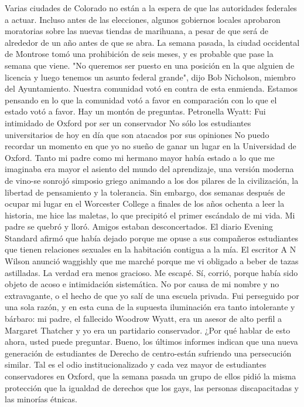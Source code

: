 Varias ciudades de Colorado no están a la espera de que las autoridades federales a actuar.
Incluso antes de las elecciones, algunos gobiernos locales aprobaron moratorias sobre las nuevas tiendas de marihuana, a pesar de que será de alrededor de un año antes de que se abra.
La semana pasada, la ciudad occidental de Montrose tomó una prohibición de seis meses, y es probable que pase la semana que viene.
"No queremos ser puesto en una posición en la que alguien de licencia y luego tenemos un asunto federal grande", dijo Bob Nicholson, miembro del Ayuntamiento.
Nuestra comunidad votó en contra de esta enmienda.
Estamos pensando en lo que la comunidad votó a favor en comparación con lo que el estado votó a favor.
Hay un montón de preguntas.
Petronella Wyatt: Fui intimidado de Oxford por ser un conservador
No sólo los estudiantes universitarios de hoy en día que son atacados por sus opiniones
No puedo recordar un momento en que yo no sueño de ganar un lugar en la Universidad de Oxford.
Tanto mi padre como mi hermano mayor había estado a lo que me imaginaba era mayor el asiento del mundo del aprendizaje, una versión moderna de vino-se sonrojó simposio griego animando a los dos pilares de la civilización, la libertad de pensamiento y la tolerancia.
Sin embargo, dos semanas después de ocupar mi lugar en el Worcester College a finales de los años ochenta a leer la historia, me hice las maletas, lo que precipitó el primer escándalo de mi vida.
Mi padre se quebró y lloró.
Amigos estaban desconcertados.
El diario Evening Standard afirmó que había dejado porque me opuse a sus compañeros estudiantes que tienen relaciones sexuales en la habitación contigua a la mía.
El escritor A N Wilson anunció waggishly que me marché porque me vi obligado a beber de tazas astilladas.
La verdad era menos gracioso.
Me escapé.
Sí, corrió, porque había sido objeto de acoso e intimidación sistemática.
No por causa de mi nombre y no extravagante, o el hecho de que yo salí de una escuela privada.
Fui perseguido por una sola razón, y en esta cuna de la supuesta iluminación era tanto intolerante y bárbaro: mi padre, el fallecido Woodrow Wyatt, era un asesor de alto perfil a Margaret Thatcher y yo era un partidario conservador.
¿Por qué hablar de esto ahora, usted puede preguntar.
Bueno, los últimos informes indican que una nueva generación de estudiantes de Derecho de centro-están sufriendo una persecución similar.
Tal es el odio institucionalizado y cada vez mayor de estudiantes conservadores en Oxford, que la semana pasada un grupo de ellos pidió la misma protección que la igualdad de derechos que los gays, las personas discapacitadas y las minorías étnicas.
